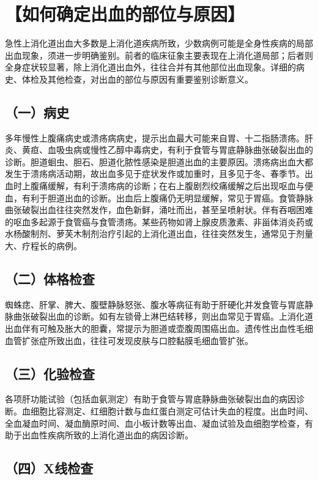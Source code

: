 \section{【如何确定出血的部位与原因】}

急性上消化道出血大多数是上消化道疾病所致，少数病例可能是全身性疾病的局部出血现象，须进一步明确鉴别。前者的临床征象主要表现在上消化道局部；后者则全身症状较显著，除上消化道出血外，往往合并有其他部位出血现象。详细的病史、体检及其他检查，对出血的部位与原因有重要鉴别诊断意义。

\subsection{（一）病史}

多年慢性上腹痛病史或溃疡病病史，提示出血最大可能来自胃、十二指肠溃疡。肝炎、黄疸、血吸虫病或慢性乙醇中毒病史，有利于食管与胃底静脉曲张破裂出血的诊断。胆道蛔虫、胆石、胆道化脓性感染是胆道出血的主要原因。溃疡病出血大都发生于溃疡病活动期，故出血多见于症状发作或加重时，且多见于冬、春季节。出血时上腹痛缓解，有利于溃疡病的诊断；在右上腹剧烈绞痛缓解之后出现呕血与便血，有利于胆道出血的诊断。出血后上腹痛仍无明显缓解，常见于胃癌。食管静脉曲张破裂出血往往突然发作，血色新鲜，涌吐而出，甚至呈喷射状。伴有吞咽困难的呕血多起源于食管癌与食管溃疡。某些药物如肾上腺皮质激素、非甾体消炎药或水杨酸制剂、萝芙木制剂治疗引起的上消化道出血，往往突然发生，通常见于剂量大、疗程长的病例。

\subsection{（二）体格检查}

蜘蛛痣、肝掌、脾大、腹壁静脉怒张、腹水等病征有助于肝硬化并发食管与胃底静脉曲张破裂出血的诊断。如有左锁骨上淋巴结转移，则出血常见于胃癌。上消化道出血伴有可触及胀大的胆囊，常提示为胆道或壶腹周围癌出血。遗传性出血性毛细血管扩张症所致出血，往往可发现皮肤与口腔黏膜毛细血管扩张。

\subsection{（三）化验检查}

各项肝功能试验（包括血氨测定）有助于食管与胃底静脉曲张破裂出血的病因诊断。血细胞比容测定、红细胞计数与血红蛋白测定可估计失血的程度。出血时间、全血凝血时间、凝血酶原时间、血小板计数等出血、凝血试验及血细胞学检查，有助于出血性疾病所致的上消化道出血的病因诊断。

\subsection{（四）X线检查}

